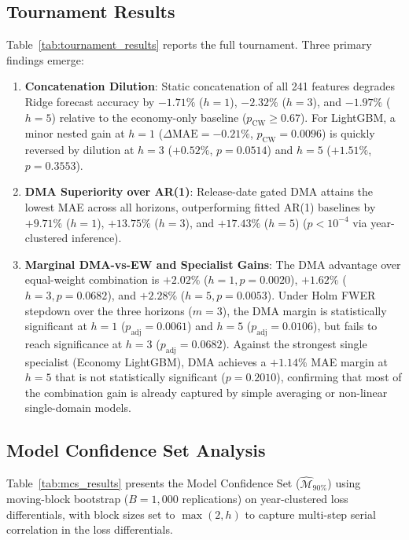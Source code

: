 \documentclass[11pt,a4paper]{article}
\begin{document}
\subsection{Tournament Results}

Table~\ref{tab:tournament_results} reports the full tournament. Three primary findings emerge:



\begin{enumerate}[leftmargin=*, label=\arabic*.]
    \item \textbf{Concatenation Dilution}: Static concatenation of all 241 features degrades Ridge forecast accuracy by $-1.71\%$ ($h{=}1$), $-2.32\%$ ($h{=}3$), and $-1.97\%$ ($h{=}5$) relative to the economy-only baseline ($p_{\text{CW}} \ge 0.67$). For LightGBM, a minor nested gain at $h=1$ ($\Delta\text{MAE} = -0.21\%$, $p_{\text{CW}} = 0.0096$) is quickly reversed by dilution at $h=3$ ($+0.52\%$, $p = 0.0514$) and $h=5$ ($+1.51\%$, $p = 0.3553$).
    \item \textbf{DMA Superiority over AR(1)}: Release-date gated DMA attains the lowest MAE across all horizons, outperforming fitted AR(1) baselines by $+9.71\%$ ($h{=}1$), $+13.75\%$ ($h{=}3$), and $+17.43\%$ ($h{=}5$) ($p < 10^{-4}$ via year-clustered inference).
    \item \textbf{Marginal DMA-vs-EW and Specialist Gains}: The DMA advantage over equal-weight combination is $+2.02\%$ ($h{=}1, p = 0.0020$), $+1.62\%$ ($h{=}3, p = 0.0682$), and $+2.28\%$ ($h{=}5, p = 0.0053$). Under Holm FWER stepdown over the three horizons ($m=3$), the DMA margin is statistically significant at $h=1$ ($p_{\text{adj}} = 0.0061$) and $h=5$ ($p_{\text{adj}} = 0.0106$), but fails to reach significance at $h=3$ ($p_{\text{adj}} = 0.0682$). Against the strongest single specialist (Economy LightGBM), DMA achieves a $+1.14\%$ MAE margin at $h=5$ that is not statistically significant ($p = 0.2010$), confirming that most of the combination gain is already captured by simple averaging or non-linear single-domain models.
\end{enumerate}

\subsection{Model Confidence Set Analysis}

Table~\ref{tab:mcs_results} presents the \citet{hansen2011} Model Confidence Set ($\widehat{\mathcal{M}}_{90\%}$) using moving-block bootstrap ($B=1{,}000$ replications) on year-clustered loss differentials, with block sizes set to $\max(2, h)$ to capture multi-step serial correlation in the loss differentials.
\end{document}
